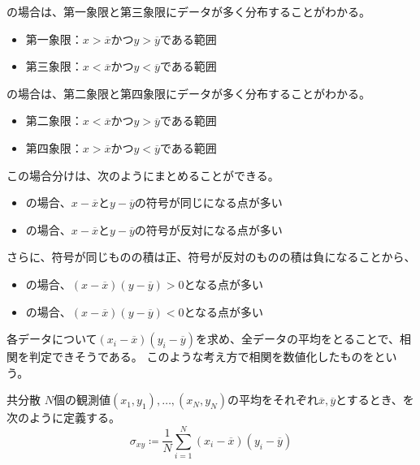 \documentclass[../../../topic_statistics]{subfiles}
\begin{document}
の場合は、第一象限と第三象限にデータが多く分布することがわかる。
\begin{itemize}
  \item 第一象限：$x > \overline{x}$かつ$y > \overline{y}$である範囲
  \item 第三象限：$x < \overline{x}$かつ$y < \overline{y}$である範囲
\end{itemize}

の場合は、第二象限と第四象限にデータが多く分布することがわかる。
\begin{itemize}
  \item 第二象限：$x < \overline{x}$かつ$y > \overline{y}$である範囲
  \item 第四象限：$x > \overline{x}$かつ$y < \overline{y}$である範囲
\end{itemize}

この場合分けは、次のようにまとめることができる。
\begin{itemize}
  \item {}の場合、$x - \overline{x}$と$y - \overline{y}$の符号が同じになる点が多い
  \item {}の場合、$x - \overline{x}$と$y - \overline{y}$の符号が反対になる点が多い
\end{itemize}

さらに、符号が同じものの積は正、符号が反対のものの積は負になることから、
\begin{itemize}
  \item {}の場合、$(x - \overline{x})(y - \overline{y}) > 0$となる点が多い
  \item {}の場合、$(x - \overline{x})(y - \overline{y}) < 0$となる点が多い
\end{itemize}

各データについて$(x_i - \overline{x})(y_i - \overline{y})$を求め、全データの平均をとることで、相関を判定できそうである。
このような考え方で相関を数値化したものをという。

\begin{definition}{共分散}
  $N$個の観測値$(x_1, y_1), \ldots, (x_N, y_N)$の平均をそれぞれ$\overline{x}, \overline{y}$とするとき、を次のように定義する。
  \begin{equation*}
    \sigma_{xy} \coloneq \frac{1}{N} \sum_{i=1}^{N} (x_i - \overline{x})(y_i - \overline{y})
  \end{equation*}
\end{definition}
\end{document}
